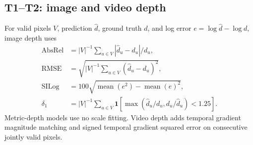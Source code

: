 \par\noindent\begin{minipage}{\columnwidth}
\centering

\label{fig:appendix-benchmark-pipeline}
\end{minipage}\par\medskip

\subsection{T1--T2: image and video depth}

For valid pixels $V$, prediction $\hat d$, ground truth $d$, and log error $e=\log\hat d-\log d$, image depth uses
\begin{align}
\operatorname{AbsRel}&=|V|^{-1}\sum_{u\in V}|\hat d_u-d_u|/d_u,\\
\operatorname{RMSE}&=\sqrt{|V|^{-1}\sum_{u\in V}(\hat d_u-d_u)^2},\\
\operatorname{SILog}&=100\sqrt{\operatorname{mean}(e^2)-\operatorname{mean}(e)^2},\\
\delta_1&=|V|^{-1}\sum_{u\in V}\mathbf{1}[\max(\hat d_u/d_u,d_u/\hat d_u)<1.25].
\end{align}
Metric-depth models use no scale fitting. Video depth adds temporal gradient magnitude matching and signed temporal gradient squared error on consecutive jointly valid pixels.

